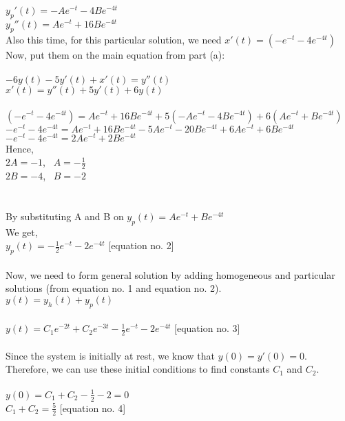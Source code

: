 \documentclass[10pt,a4paper, margin=1in]{article}
\begin{document}
\begin{enumerate}
\begin{enumerate}
    $y_p'(t) = -A e^{-t} -4B e^{-4t}$ \\
    $y_p''(t) = A e^{-t} + 16B e^{-4t}$ \\
    Also this time, for this particular solution, we need $x'(t) = (-e^{-t} -4 e^{-4t})$ 
    \\
    Now, put them on the main equation from part (a): \\
    \\
    $-6y(t) - 5y'(t) + x'(t) = y''(t)$ \\
    $x'(t) = y''(t) + 5y'(t) + 6y(t)$ \\
    \\
    $(-e^{-t} -4 e^{-4t}) =  A e^{-t} + 16B e^{-4t} + 5(-A e^{-t} -4B e^{-4t}) + 6(A e^{-t} + B e^{-4t})$ \\
    $-e^{-t} -4 e^{-4t} =  A e^{-t} + 16B e^{-4t} -5A e^{-t} -20B e^{-4t} + 6A e^{-t} + 6B e^{-4t}$ \\
    $-e^{-t} -4 e^{-4t} =  2A e^{-t} + 2B e^{-4t} $ \\
    Hence, \\
    $2A = -1$, \ $A = - \frac{1}{2}$ \\
    $2B = -4$, \ $B = -2$ \\
    \\
    \\
    By substituting A and B on $y_p(t) = A e^{-t} + B e^{-4t}$ \\
    We get, \\
    $y_p(t) = - \frac{1}{2}e^{-t} -2 e^{-4t}$ [equation no. 2] \\
    \\
    Now, we need to form general solution by adding homogeneous and particular solutions (from equation no. 1 and equation no. 2). \\
    $y(t) = y_h(t) + y_p(t)$ \\
    \\
    $y(t) = C_1 e^{-2 t} + C_2 e^{-3 t} - \frac{1}{2}e^{-t} -2 e^{-4t} $  [equation no. 3]\\
    \\
    Since the system is initially at rest, we know that $y(0) = y'(0) = 0$. Therefore, we can use these initial conditions to find constants $C_1$ and $C_2$. \\
    \\
    $y(0) = C_1 + C_2 - \frac{1}{2} -2 = 0$ \\
    $ C_1 + C_2 =  \frac{5}{2}$ [equation no. 4] \\
    \\

\end{enumerate}
\end{enumerate}
\end{document}
